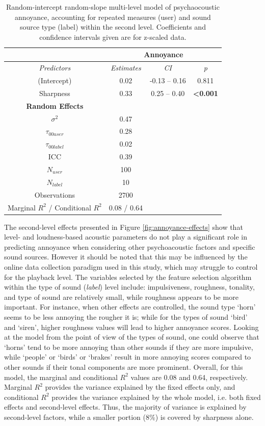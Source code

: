 \begin{table}[h]
  \centering
  \caption{Random-intercept random-slope multi-level model of psychaocoustic annoyance, accounting for repeated measures (user) and sound source type (label) within the second level. Coefficients and confidence intervals given are for z-scaled data.}
  \label{tab:annoyance-model}
  \begin{tabular}{cccc} 
  \toprule
   & \multicolumn{3}{c}{\textbf{Annoyance }} \\ 
  \hline
  \textit{Predictors} & \textit{Estimates} & \textit{CI} & \textit{p} \\ 
  \hline
  (Intercept) & 0.02 & -0.13 -- 0.16 & 0.811 \\
  Sharpness & 0.33 & 0.25 -- 0.40 & \textbf{\textless{}0.001} \\ 
  \hline
  \textbf{Random Effects} &  &  &  \\ 
  \hline
  $\sigma^2$ & 0.47 &  &  \\
  $\tau_{00user}$ & 0.28 &  &  \\
  $\tau_{00label}$ & 0.02 &  &  \\
  ICC & 0.39 &  &  \\
  $N_{user}$ & 100 &  &  \\
  $N_{label}$ & 10 &  &  \\ 
  \hline
  Observations & 2700 &  &  \\
  Marginal $R^2$ / Conditional $R^2$ & 0.08 / 0.64 &  &  \\
  \bottomrule
  \end{tabular}
  \end{table}

The second-level effects presented in Figure \ref{fig:annoyance-effects} show that level- and loudness-based acoustic parameters do not play a significant role in predicting annoyance when considering other psychoacoustic factors and specific sound sources. However it should be noted that this may be influenced by the online data collection paradigm used in this study, which may struggle to control for the playback level. The variables selected by the feature selection algorithm within the type of sound (\emph{label}) level include: impulsiveness, roughness, tonality, and type of sound are relatively small, while roughness appears to be more important. For instance, when other effects are controlled, the sound type `horn' seems to be less annoying the rougher it is; while for the types of sound `bird' and `siren', higher roughness values will lead to higher annoyance scores. Looking at the model from the point of view of the types of sound, one could observe that `horns' tend to be more annoying than other sounds if they are more impulsive, while `people' or `birds' or `brakes' result in more annoying scores compared to other sounds if their tonal components are more prominent. Overall, for this model, the marginal and conditional $R^2$ values are 0.08 and 0.64, respectively. Marginal $R^2$ provides the variance explained by the fixed effects only, and conditional $R^2$ provides the variance explained by the whole model, i.e. both fixed effects and second-level effects. Thus, the majority of variance is explained by second-level factors, while a smaller portion (8\%) is covered by sharpness alone.

